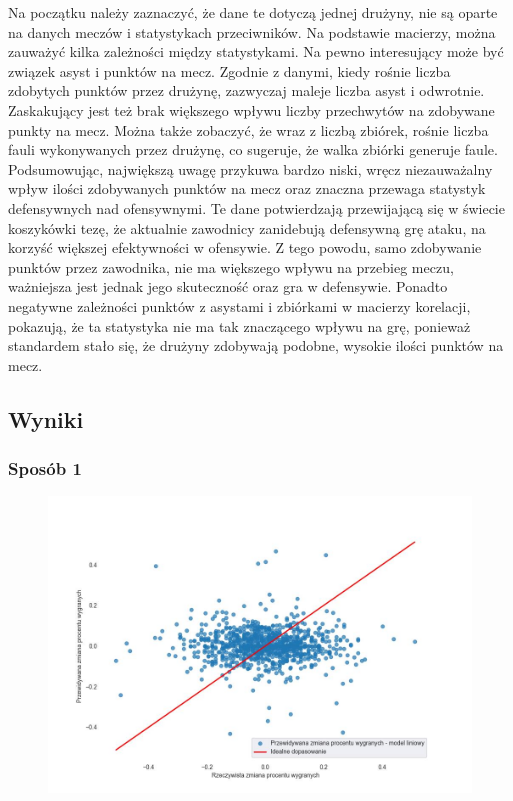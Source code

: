 \documentclass{article}
\begin{document}
Na początku należy zaznaczyć, że dane te dotyczą jednej drużyny, nie są oparte na danych meczów i statystykach przeciwników. Na podstawie macierzy, można zauważyć kilka zależności między statystykami. Na pewno interesujący może być związek asyst i punktów na mecz. Zgodnie z danymi, kiedy rośnie liczba zdobytych punktów przez drużynę, zazwyczaj maleje liczba asyst i odwrotnie. Zaskakujący jest też brak większego wpływu liczby przechwytów na zdobywane punkty na mecz. Można także zobaczyć, że wraz z liczbą zbiórek, rośnie liczba fauli wykonywanych przez drużynę, co sugeruje, że walka zbiórki generuje faule.
\newline
\newline
Podsumowując, największą uwagę przykuwa bardzo niski, wręcz niezauważalny wpływ ilości zdobywanych punktów na mecz oraz znaczna przewaga statystyk defensywnych nad ofensywnymi. Te dane potwierdzają przewijającą się w świecie koszykówki tezę, że aktualnie zawodnicy zanidebują defensywną grę ataku, na korzyść większej efektywności w ofensywie. Z tego powodu, samo zdobywanie punktów przez zawodnika, nie ma większego wpływu na przebieg meczu, ważniejsza jest jednak jego skuteczność oraz gra w defensywie. Ponadto negatywne zależności punktów z asystami i zbiórkami w macierzy korelacji, pokazują, że ta statystyka nie ma tak znaczącego wpływu na grę, ponieważ standardem stało się, że drużyny zdobywają podobne, wysokie ilości punktów na mecz.
\newpage


\subsection{Wyniki}


\subsubsection{Sposób 1}
\begin{figure}[htp]
    \centering
    \includegraphics[width=16cm]{linear_model.jpg}
    \label{fig:linear_model}
\end{figure}
\end{document}
